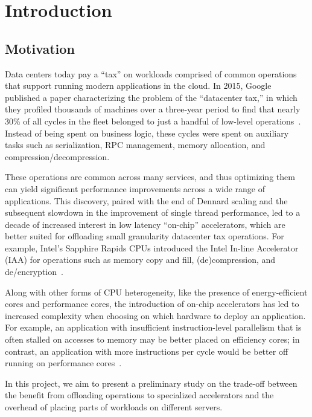 \section{Introduction}

\subsection{Motivation}

Data centers today pay a ``tax'' on workloads comprised of common operations that support running modern applications in the cloud.
In 2015, Google published a paper characterizing the problem of the ``datacenter tax,'' in which they profiled thousands of machines over a three-year period to find that nearly 30\% of all cycles in the fleet belonged to just a handful of low-level operations~\cite{kanev2015profiling}.
Instead of being spent on business logic, these cycles were spent on auxiliary tasks such as serialization, RPC management, memory allocation, and compression/decompression.


These operations are common across many services, and thus optimizing them can yield significant performance improvements across a wide range of applications.
This discovery, paired with the end of Dennard scaling and the subsequent slowdown in the improvement of single thread performance, led to a decade of increased interest in low latency ``on-chip'' accelerators, which are better suited for offloading small granularity datacenter tax operations.
For example, Intel's Sapphire Rapids CPUs introduced the Intel In-line Accelerator (IAA) for operations such as memory copy and fill, (de)compression, and de/encryption~\cite{yuan2024intel}.

Along with other forms of CPU heterogeneity, like the presence of energy-efficient cores and performance cores, the introduction of on-chip accelerators has led to increased complexity when choosing on which hardware to deploy an application.
For example, an application with insufficient instruction-level parallelism that is often stalled on accesses to memory may be better placed on efficiency cores; in contrast, an application with more instructions per cycle would be better off running on performance cores~\cite{kanev2015profiling}.

In this project, we aim to present a preliminary study on the trade-off between the benefit from offloading operations to specialized accelerators and the overhead of placing parts of workloads on different servers.

